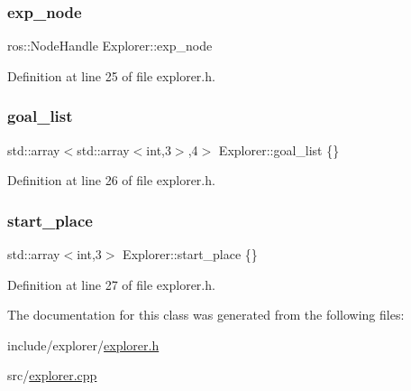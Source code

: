 \subsubsection{\texorpdfstring{exp\+\_\+node}{exp\_node}}
{\footnotesize\ttfamily ros\+::\+Node\+Handle Explorer\+::exp\+\_\+node}



Definition at line 25 of file explorer.\+h.

\mbox{\label{class_explorer_acda1856f421dfe836f39de446415b969}} 
\subsubsection{\texorpdfstring{goal\+\_\+list}{goal\_list}}
{\footnotesize\ttfamily std\+::array$<$std\+::array$<$int,3$>$,4$>$ Explorer\+::goal\+\_\+list \{\}}



Definition at line 26 of file explorer.\+h.

\mbox{\label{class_explorer_af1aee46522a58db39d3643f2138c76fa}} 
\subsubsection{\texorpdfstring{start\+\_\+place}{start\_place}}
{\footnotesize\ttfamily std\+::array$<$int,3$>$ Explorer\+::start\+\_\+place \{\}}



Definition at line 27 of file explorer.\+h.



The documentation for this class was generated from the following files\+:\begin{DoxyCompactItemize}
\item 
include/explorer/\hyperlink{explorer_8h}{explorer.\+h}\item 
src/\hyperlink{explorer_8cpp}{explorer.\+cpp}\end{DoxyCompactItemize}
